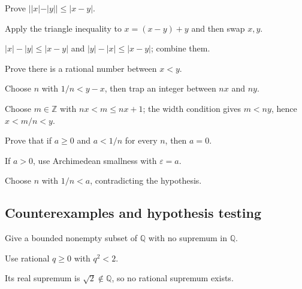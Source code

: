 \begin{exercise}\label{exr:ii01-expand-07}
Prove \(||x|-|y||\le|x-y|\).
\end{exercise}
\begin{hint}
Apply the triangle inequality to \(x=(x-y)+y\) and then swap \(x,y\).
\end{hint}
\begin{solution}
\(|x|-|y|\le|x-y|\) and \(|y|-|x|\le|x-y|\); combine them.
\end{solution}

\begin{exercise}\label{exr:ii01-expand-08}
Prove there is a rational number between \(x<y\).
\end{exercise}
\begin{hint}
Choose \(n\) with \(1/n<y-x\), then trap an integer between \(nx\) and \(ny\).
\end{hint}
\begin{solution}
Choose \(m\in\mathbb Z\) with \(nx<m\le nx+1\); the width condition gives \(m<ny\), hence \(x<m/n<y\).
\end{solution}

\begin{exercise}\label{exr:ii01-expand-09}
Prove that if \(a\ge0\) and \(a<1/n\) for every \(n\), then \(a=0\).
\end{exercise}
\begin{hint}
If \(a>0\), use Archimedean smallness with \(\varepsilon=a\).
\end{hint}
\begin{solution}
Choose \(n\) with \(1/n<a\), contradicting the hypothesis.
\end{solution}

\subsection*{Counterexamples and hypothesis testing}

\begin{exercise}\label{exr:ii01-expand-10}
Give a bounded nonempty subset of \(\mathbb Q\) with no supremum in \(\mathbb Q\).
\end{exercise}
\begin{hint}
Use rational \(q\ge0\) with \(q^2<2\).
\end{hint}
\begin{solution}
Its real supremum is \(\sqrt2\notin\mathbb Q\), so no rational supremum exists.
\end{solution}

